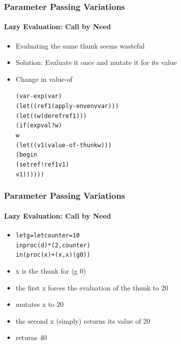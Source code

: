 \documentclass{beamer}
\begin{document}
\begin{frame}[fragile]
\frametitle{Parameter Passing Variations}
\framesubtitle{Lazy Evaluation: Call by Need}
\begin{scriptsize}
\begin{itemize}
\item<1-> Evaluating the same thunk seems wasteful

\item<2-> Solution: Evaluate it once and mutate it for its value

\item<3-> Change in value-of
\begin{alltt}
(var-exp (var)
  (let ((ref1 (apply-env env var)))
    (let ((w (deref ref1)))
      (if (expval? w)
          w	
          (let ((v1 (value-of-thunk w)))
            (begin
              (setref! ref1 v1)
              v1))))))
\end{alltt}

\end{itemize}
\end{scriptsize}
\end{frame}

\begin{frame}[fragile]
\frametitle{Parameter Passing Variations}
\framesubtitle{Lazy Evaluation: Call by Need}
\begin{scriptsize}
\begin{itemize}
\item<1->
\begin{alltt}
let g = let counter = 10
        in proc (d) *(2, counter)
in (proc (x) +(x, x) (g 0))
\end{alltt}

\item<2-> x is the thunk for (g 0)

\item<3-> the first x forces the evaluation of the thunk to 20

\item<3-> mutates x to 20

\item<4-> the second x (simply) returns its value of 20

\item<4-> returns 40


\end{itemize}
\end{scriptsize}
\end{frame}
\end{document}
